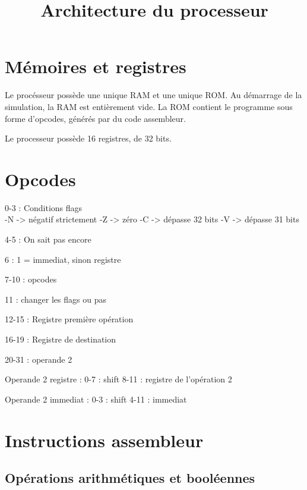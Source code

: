 \documentclass[a4paper]{article}
\title{Architecture du processeur}
\begin{document}
\maketitle

\section{Mémoires et registres}

Le procésseur possède une unique RAM et une unique ROM. Au démarrage de la
simulation, la RAM est entièrement vide. La ROM contient le programme sous forme
d'opcodes, générés par du code assembleur.

Le processeur possède 16 registres, de 32 bits.

\section{Opcodes}

0-3 : Conditions flags\\
-N -> négatif strictement
-Z -> zéro
-C -> dépasse 32 bits
-V -> dépasse 31 bits

4-5 : On sait pas encore

6 : 1 = immediat, sinon registre

7-10 : opcodes

11 : changer les flags ou pas

12-15 : Registre première opération

16-19 : Registre de destination

20-31 : operande 2


Operande 2 registre :
0-7 : shift
8-11 : registre de l'opération 2

Operande 2 immediat :
0-3 : shift
4-11 : immediat

\section{Instructions assembleur}

\subsection{Opérations arithmétiques et booléennes}
\end{document}
